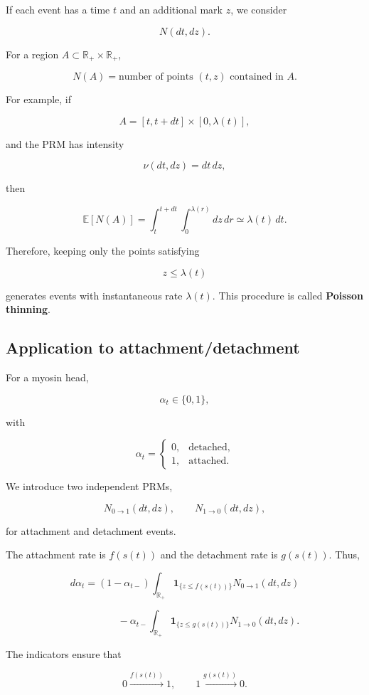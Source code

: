 \documentclass{article}
\begin{document}
If each event has a time $t$ and an additional mark $z$, we consider

\[
\boxed{
N(dt,dz).
}
\]

For a region $A\subset\mathbb{R}_+\times\mathbb{R}_+$,

\[
N(A)
=
\text{number of points }(t,z)\text{ contained in }A.
\]

For example, if

\[
A=[t,t+dt]\times[0,\lambda(t)],
\]

and the PRM has intensity

\[
\nu(dt,dz)=dt\,dz,
\]

then

\[
\mathbb{E}[N(A)]
=
\int_t^{t+dt}\int_0^{\lambda(r)} dz\,dr
\simeq
\lambda(t)\,dt.
\]

Therefore, keeping only the points satisfying

\[
\boxed{
z\leq\lambda(t)
}
\]

generates events with instantaneous rate $\lambda(t)$.
This procedure is called \textbf{Poisson thinning}.

\subsection{Application to attachment/detachment}

For a myosin head,

\[
\alpha_t\in\{0,1\},
\]

with

\[
\alpha_t=
\begin{cases}
0, & \text{detached},\\
1, & \text{attached}.
\end{cases}
\]

We introduce two independent PRMs,

\[
N_{0\to1}(dt,dz),
\qquad
N_{1\to0}(dt,dz),
\]

for attachment and detachment events.

The attachment rate is $f(s(t))$ and the detachment rate is $g(s(t))$.
Thus,

\[
d\alpha_t
=
(1-\alpha_{t-})
\int_{\mathbb{R}_+}
\mathbf{1}_{\{z\leq f(s(t))\}}
N_{0\to1}(dt,dz)
\]

\[
\hspace{2cm}
-
\alpha_{t-}
\int_{\mathbb{R}_+}
\mathbf{1}_{\{z\leq g(s(t))\}}
N_{1\to0}(dt,dz).
\]

The indicators ensure that

\[
0\xrightarrow{f(s(t))}1,
\qquad
1\xrightarrow{g(s(t))}0.
\]
\end{document}
